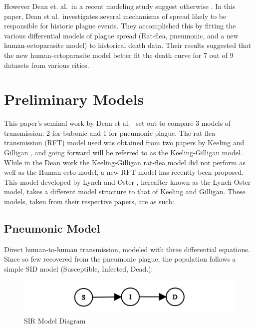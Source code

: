 \documentclass [letterpaper, 12pt] {article}
\begin{document}
However Dean et. al.\ in a recent modeling study suggest otherwise \cite{Dean1304}. In this paper, Dean et al.\ investigates several mechanisms of spread likely to be responsible for historic plague events. They accomplished this by fitting the various differential models of plague spread (Rat-flea, pneumonic, and  a new human-ectoparasite model) to historical death data. Their results suggested that the new human-ectoparasite model better fit the death curve for 7 out of 9 datasets from various cities.

%


\pagebreak

\section {Preliminary Models}
This paper's seminal work by Dean et al.\ \cite{Dean1304} set out to compare 3 models of
transmission: 2 for bubonic and 1 for pneumonic plague. The rat-flea-transmission (RFT) model used was obtained from two papers by Keeling and Gilligan \cite{keeling_gilligan_zoonosis} \cite{keeling2000}, and going forward will be referred to as the Keeling-Gilligan model. While in the Dean work the Keeling-Gilligan rat-flea model did not perform as well as the Human-ecto model, a new RFT model has recently been proposed. This model developed by Lynch and Oster \cite{lynch-plague-modeling} , hereafter known as the Lynch-Oster model, takes a different model structure to that of Keeling and Gilligan. These models, taken from their respective papers, are as such:

\subsection {Pneumonic Model}
Direct human-to-human transmission, modeled with three differential equations. Since so few recovered from the pneumonic plague, the population follows a simple SID model
(Susceptible, Infected, Dead.):

\begin{figure}[H]
	\centering
	\includegraphics[width=0.5\linewidth]{sid-graph.png}
	\caption{SIR Model Diagram}
\end{figure}
\end{document}
